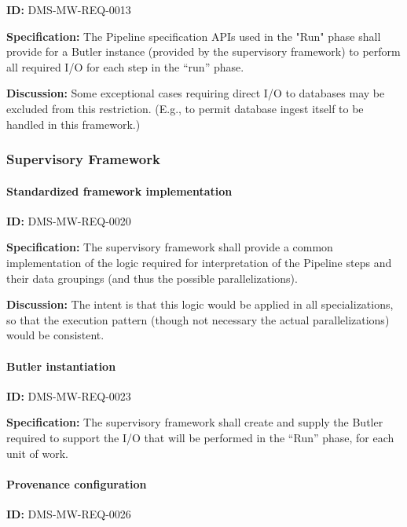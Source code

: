 \documentclass[SE,toc,lsstdraft]{lsstdoc}
\begin{document}
\label{DMS-MW-REQ-0013}
\textbf{ID:} DMS-MW-REQ-0013

\textbf{Specification:}
The Pipeline specification APIs used in the "Run" phase shall provide for a Butler instance (provided by the supervisory framework) to perform all required I/O for each step in the “run” phase.

\textbf{Discussion:}
Some exceptional cases requiring direct I/O to databases may be excluded from this restriction. (E.g., to permit database ingest itself to be handled in this framework.)

\subsubsection{Supervisory Framework}

\paragraph{Standardized framework implementation}\hfill  %

\label{DMS-MW-REQ-0020}
\textbf{ID:} DMS-MW-REQ-0020

\textbf{Specification:}
The supervisory framework shall provide a common implementation of the logic required for interpretation of the Pipeline steps and their data groupings (and thus the possible parallelizations).

\textbf{Discussion:}
The intent is that this logic would be applied in all specializations, so that the execution pattern (though not necessary the actual parallelizations) would be consistent.

\paragraph{Butler instantiation}\hfill  %

\label{DMS-MW-REQ-0023}
\textbf{ID:} DMS-MW-REQ-0023

\textbf{Specification:}
The supervisory framework shall create and supply the Butler required to support the I/O that will be performed in the “Run” phase, for each unit of work.

\paragraph{Provenance configuration}\hfill  %

\label{DMS-MW-REQ-0026}
\textbf{ID:} DMS-MW-REQ-0026
\end{document}
